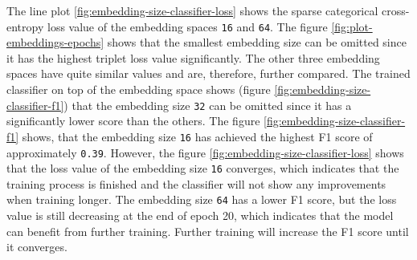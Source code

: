 \newline
\newline
The line plot \ref{fig:embedding-size-classifier-loss} shows the sparse categorical cross-entropy loss value of the embedding spaces \texttt{16} and \texttt{64}.
\newline
\newline
The figure \ref{fig:plot-embeddings-epochs} shows that the smallest embedding size can be omitted since it has the highest triplet loss value significantly. The other three embedding spaces have quite similar values and are, therefore, further compared. The trained classifier on top of the embedding space shows (figure \ref{fig:embedding-size-classifier-f1}) that the embedding size \texttt{32} can be omitted since it has a significantly lower score than the others. The figure \ref{fig:embedding-size-classifier-f1} shows, that the embedding size \texttt{16} has achieved the highest F1 score of approximately \texttt{0.39}. However, the figure \ref{fig:embedding-size-classifier-loss} shows that the loss value of the embedding size \texttt{16} converges, which indicates that the training process is finished and the classifier will not show any improvements when training longer. The embedding size \texttt{64} has a lower F1 score, but the loss value is still decreasing at the end of epoch 20, which indicates that the model can benefit from further training. Further training will increase the F1 score until it converges.
